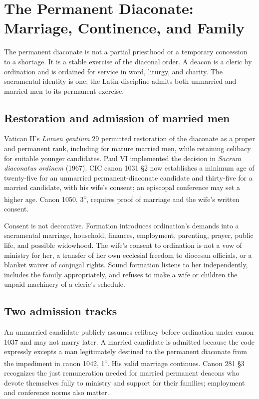 \section{The Permanent Diaconate: Marriage, Continence, and Family}

The permanent diaconate is not a partial priesthood or a temporary concession to a shortage. It is a stable exercise of the diaconal order. A deacon is a cleric by ordination and is ordained for service in word, liturgy, and charity. The sacramental identity is one; the Latin discipline admits both unmarried and married men to its permanent exercise.

\subsection{Restoration and admission of married men}

Vatican II's \emph{Lumen gentium} 29 permitted restoration of the diaconate as a proper and permanent rank, including for mature married men, while retaining celibacy for suitable younger candidates. Paul VI implemented the decision in \emph{Sacrum diaconatus ordinem} (1967). CIC canon 1031 \S2 now establishes a minimum age of twenty-five for an unmarried permanent-diaconate candidate and thirty-five for a married candidate, with his wife's consent; an episcopal conference may set a higher age. Canon 1050, 3\textsuperscript{o}, requires proof of marriage and the wife's written consent.

Consent is not decorative. Formation introduces ordination's demands into a sacramental marriage, household, finances, employment, parenting, prayer, public life, and possible widowhood. The wife's consent to ordination is not a vow of ministry for her, a transfer of her own ecclesial freedom to diocesan officials, or a blanket waiver of conjugal rights. Sound formation listens to her independently, includes the family appropriately, and refuses to make a wife or children the unpaid machinery of a cleric's schedule.

\subsection{Two admission tracks}

An unmarried candidate publicly assumes celibacy before ordination under canon 1037 and may not marry later. A married candidate is admitted because the code expressly excepts a man legitimately destined to the permanent diaconate from the impediment in canon 1042, 1\textsuperscript{o}. His valid marriage continues. Canon 281 \S3 recognizes the just remuneration needed for married permanent deacons who devote themselves fully to ministry and support for their families; employment and conference norms also matter.

